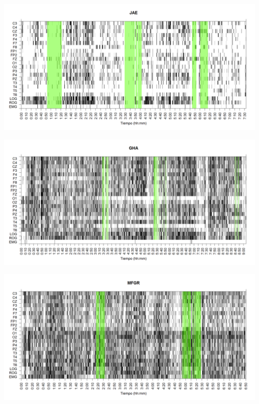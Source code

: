 
\begin{SidewaysFigure}
\centering
\includegraphics[width=\linewidth]
{./grafiquitos170404/JANASUE_est.png} 
\caption{Sujeto: JAE | Total \'epocas: 907 | \'Epocas MOR: 171
}
\label{JAE}
\end{SidewaysFigure}


\begin{SidewaysFigure}
\centering
\includegraphics[width=\linewidth]
{./grafiquitos170404/GH24031950SUENO_est.png} 
\caption{Sujeto: GHA | Total \'epocas: 3281 | \'Epocas MOR: 134
}
\label{GHA}
\end{SidewaysFigure}


\begin{SidewaysFigure}
\centering
\includegraphics[width=\linewidth]
{./grafiquitos170404/GURM251148SUE_est.png} 
\caption{Sujeto: MFGR | Total \'epocas: 2466 | \'Epocas MOR: 267
}
\label{MHGR}
\end{SidewaysFigure}

